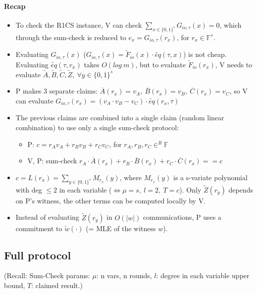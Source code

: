 \documentclass{article}
\theoremstyle{definition}
\begin{document}
\paragraph{Recap}
\begin{itemize}
	\item[] To check the R1CS instance, V can check $\sum_{x \in \{0,1\}^s} G_{io, \tau} (x) = 0$, which through the sum-check is reduced to $e_x = G_{io, \tau} (r_x)$, for $r_x \in \mathbb{F}^s$.
	\item[] Evaluating $G_{io, \tau}(x)$ ($G_{io, \tau}(x) = \widetilde{F}_{io}(x) \cdot \widetilde{eq}(\tau, x)$) is not cheap. Evaluating $\widetilde{eq}(\tau, r_x)$ takes $O(log~m)$, but to evaluate $\widetilde{F}_{io}(r_x)$, V needs to evaluate $\widetilde{A}, \widetilde{B}, \widetilde{C}, \widetilde{Z},~ \forall y \in \{0,1\}^s$
	\item[] P makes 3 separate claims: $\overline{A}(r_x)=v_A,~ \overline{B}(r_x)=v_B,~ \overline{C}(r_x)=v_C$, so V can evaluate $G_{io, \tau}(r_x) = (v_A \cdot v_B - v_C) \cdot \widetilde{eq}(r_x, \tau)$
	\item[] The previous claims are combined into a single claim (random linear combination) to use only a single sum-check protocol:
		\begin{itemize}
			\item[] P: $c= r_A v_A + r_B v_B + r_C v_C$, for $r_A, r_B, r_C \in^R \mathbb{F}$
			\item[] V, P: sum-check $r_A \cdot \overline{A}(r_x) + r_B \cdot \overline{B}(r_x) + r_C \cdot \overline{C}(r_x) == c$
		\end{itemize}
	\item[] $c=L(r_x)=\sum_{y \in \{0,1\}^s} M_{r_x}(y)$, where $M_{r_x}(y)$ is a s-variate polynomial with deg $\leq 2$ in each variable ($\Longleftrightarrow \mu = s,~ l=2,~ T=c$). Only $\widetilde{Z}(r_y)$ depends on P's witness, the other terms can be computed locally by V.
	\item[] Instead of evaluating $\widetilde{Z}(r_y)$ in $O(|w|)$ communications, P uses a commitment to $\widetilde{w}(\cdot)$ (= MLE of the witness $w$).
\end{itemize}

\subsection{Full protocol}
\begin{footnotesize}
	(Recall: Sum-Check params: $\mu$: n vars, n rounds, $l$: degree in each variable upper bound, $T$: claimed result.)
\end{footnotesize}
\end{document}
